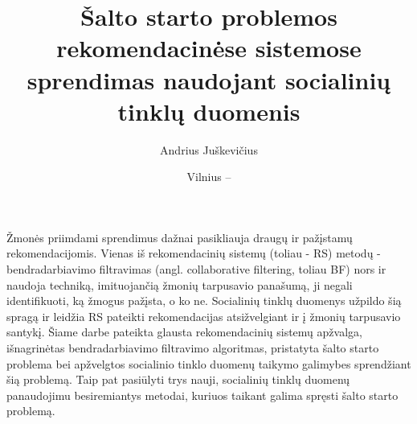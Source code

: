 \documentclass{VUMIFInfMagistrinis}
\title{Šalto starto problemos rekomendacinėse sistemose sprendimas naudojant socialinių tinklų duomenis}
\author{Andrius Juškevičius}
\date{Vilnius – \the\year}
\begin{document}
\maketitle


Žmonės priimdami sprendimus dažnai pasikliauja draugų ir pažįstamų rekomendacijomis. Vienas iš rekomendacinių sistemų (toliau - RS) metodų - bendradarbiavimo filtravimas (angl. collaborative filtering, toliau BF) nors ir naudoja techniką, imituojančią žmonių tarpusavio panašumą, ji negali identifikuoti, ką žmogus pažįsta, o ko ne. Socialinių tinklų duomenys užpildo šią spragą ir leidžia RS pateikti rekomendacijas atsižvelgiant ir į žmonių tarpusavio santykį. 
\newline
\indent
Šiame darbe pateikta glausta rekomendacinių sistemų apžvalga, išnagrinėtas bendradarbiavimo filtravimo algoritmas, pristatyta šalto starto problema bei apžvelgtos socialinio tinklo duomenų taikymo galimybes sprendžiant šią problemą. Taip pat pasiūlyti trys nauji, socialinių tinklų duomenų panaudojimu besiremiantys metodai, kuriuos taikant galima spręsti šalto starto problemą.

\tableofcontents
\end{document}
